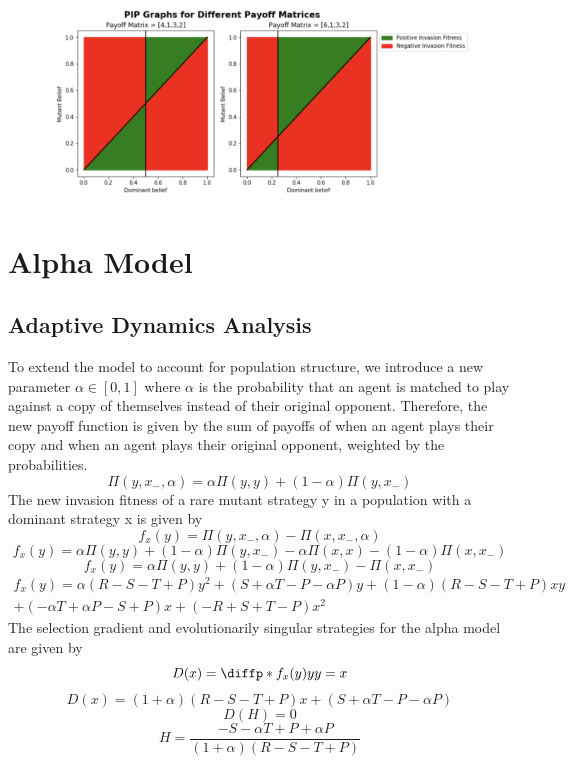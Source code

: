 \documentclass[]{llncs}
\begin{document}
\begin{figure}
\centering
\includegraphics[width=15cm]{images/pip_basic}
\caption{ }
\end{figure}


\section{Alpha Model}

\subsection{Adaptive Dynamics Analysis}

To extend the model to account for population structure, we introduce a new parameter $\alpha \in [0, 1]$ where $\alpha$ is the probability that an agent is matched to play against a copy of themselves instead of their original opponent. Therefore, the new payoff function is given by the sum of payoffs of when an agent plays their copy and when an agent plays their original opponent, weighted by the probabilities.
\[ 
\Pi ( y, x_{-}, \alpha ) = \alpha \Pi ( y, y) + (1-\alpha) \Pi ( y, x_{-} )
\]
The new invasion fitness of a rare mutant strategy y in a population with a dominant strategy x is given by 
\[
f_x(y) = \Pi ( y, x_{-}, \alpha ) - \Pi ( x, x_{-}, \alpha )
\]
\[
f_x(y) = \alpha \Pi ( y, y) + (1-\alpha) \Pi ( y, x_{-} ) - \alpha \Pi ( x, x) - (1-\alpha) \Pi ( x,  x_{-} )
\]
\[
f_x(y) = \alpha \Pi ( y, y) + (1-\alpha) \Pi ( y, x_{-} ) - \Pi ( x,  x_{-} )
\]
\begin{multline}
f_x(y) = \alpha (R-S-T+P) y^2 +(S + \alpha T - P - \alpha P) y + (1-\alpha) (R-S-T+P) x y \\+ (-\alpha T + \alpha P - S + P) x + (-R+S+T-P) x^2
\end{multline}
The selection gradient and evolutionarily singular strategies for the alpha model are given by 
\[
D(x) = \diffp*{f_x(y)}{y}{y=x}
\]
\[
D(x) = (1+\alpha) (R-S-T+P) x + (S + \alpha T - P - \alpha P) 
\]
\[
D(H) = 0
\]
\[
H = \frac{-S - \alpha T + P + \alpha P}{(1+\alpha)(R-S-T+P)}
\]
\end{document}
